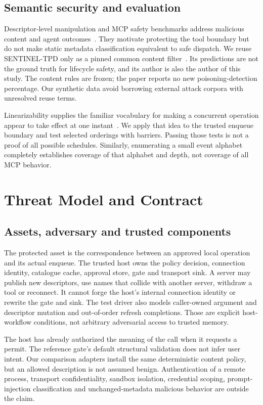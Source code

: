 \subsection{Semantic security and evaluation}
Descriptor-level manipulation and MCP safety benchmarks address malicious content
and agent outcomes~\cite{semanticattacks,msb}. They motivate protecting the tool
boundary but do not make static metadata classification equivalent to safe dispatch.
We reuse SENTINEL-TPD only as a pinned common content filter~\cite{sentineltpd}.
Its predictions are not the ground truth for lifecycle safety, and its author is
also the author of this study. The content rules are frozen; the paper reports no
new poisoning-detection percentage. Our synthetic data avoid borrowing external
attack corpora with unresolved reuse terms.

Linearizability supplies the familiar vocabulary for making a concurrent operation
appear to take effect at one instant~\cite{linearizability}. We apply that idea to
the trusted enqueue boundary and test selected orderings with barriers. Passing
those tests is not a proof of all possible schedules. Similarly, enumerating a
small event alphabet completely establishes coverage of that alphabet and depth,
not coverage of all MCP behavior.

\section{Threat Model and Contract}
\subsection{Assets, adversary and trusted components}
The protected asset is the correspondence between an approved local operation and
its actual enqueue. The trusted host owns the policy decision, connection identity,
catalogue cache, approval store, gate and transport sink. A server may publish new
descriptors, use names that collide with another server, withdraw a tool or reconnect.
It cannot forge the host's internal connection identity or rewrite the gate and sink.
The test driver also models caller-owned argument and descriptor mutation and
out-of-order refresh completions. Those are explicit host-workflow conditions,
not arbitrary adversarial access to trusted memory.

The host has already authorized the meaning of the call when it requests a permit.
The reference gate's default structural validation does not infer user intent.
Our comparison adapters install the same deterministic content policy, but an
allowed description is not assumed benign. Authentication of a remote process,
transport confidentiality, sandbox isolation, credential scoping, prompt-injection
classification and unchanged-metadata malicious behavior are outside the claim.

